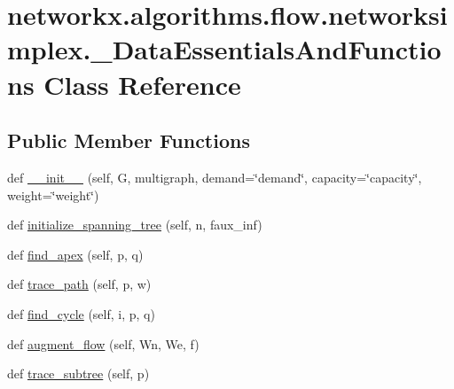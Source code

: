 \hypertarget{classnetworkx_1_1algorithms_1_1flow_1_1networksimplex_1_1__DataEssentialsAndFunctions}{}\section{networkx.\+algorithms.\+flow.\+networksimplex.\+\_\+\+Data\+Essentials\+And\+Functions Class Reference}
\label{classnetworkx_1_1algorithms_1_1flow_1_1networksimplex_1_1__DataEssentialsAndFunctions}
\subsection*{Public Member Functions}
\begin{DoxyCompactItemize}
\item 
def \hyperlink{classnetworkx_1_1algorithms_1_1flow_1_1networksimplex_1_1__DataEssentialsAndFunctions_ad525aa83bcf57f66e793ac670b3bbb35}{\+\_\+\+\_\+init\+\_\+\+\_\+} (self, G, multigraph, demand=\char`\"{}demand\char`\"{}, capacity=\char`\"{}capacity\char`\"{}, weight=\char`\"{}weight\char`\"{})
\item 
def \hyperlink{classnetworkx_1_1algorithms_1_1flow_1_1networksimplex_1_1__DataEssentialsAndFunctions_a7c6ecc70e5d936b0e91b665605d73740}{initialize\+\_\+spanning\+\_\+tree} (self, n, faux\+\_\+inf)
\item 
def \hyperlink{classnetworkx_1_1algorithms_1_1flow_1_1networksimplex_1_1__DataEssentialsAndFunctions_ad05f1bffafc5e9b64b5225cffcd14170}{find\+\_\+apex} (self, p, q)
\item 
def \hyperlink{classnetworkx_1_1algorithms_1_1flow_1_1networksimplex_1_1__DataEssentialsAndFunctions_a508379a760e05e62dd8a9021884d165c}{trace\+\_\+path} (self, p, w)
\item 
def \hyperlink{classnetworkx_1_1algorithms_1_1flow_1_1networksimplex_1_1__DataEssentialsAndFunctions_aa0c6f84275c8444ef08fd5d5764ae632}{find\+\_\+cycle} (self, i, p, q)
\item 
def \hyperlink{classnetworkx_1_1algorithms_1_1flow_1_1networksimplex_1_1__DataEssentialsAndFunctions_a37d09f31ab974d482b41e9382b42ffd3}{augment\+\_\+flow} (self, Wn, We, f)
\item 
def \hyperlink{classnetworkx_1_1algorithms_1_1flow_1_1networksimplex_1_1__DataEssentialsAndFunctions_a7a8e778c323f77220aa60e3a8ebf3a32}{trace\+\_\+subtree} (self, p)
\item 

\end{DoxyCompactItemize}
